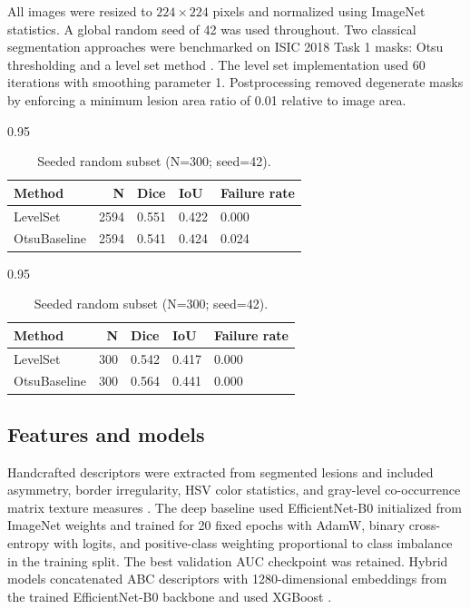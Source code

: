 \documentclass[preprint,12pt]{elsarticle}
\begin{document}
All images were resized to $224 \times 224$ pixels and normalized using ImageNet statistics. A global random seed of 42 was used throughout. Two classical segmentation approaches were benchmarked on ISIC 2018 Task 1 masks: Otsu thresholding \cite{otsu1979threshold} and a level set method \cite{osher1988fronts,li2010drlse}. The level set implementation used 60 iterations with smoothing parameter 1. Postprocessing removed degenerate masks by enforcing a minimum lesion area ratio of 0.01 relative to image area.

\begin{table}[htbp]
\centering
\caption{Segmentation benchmarking on ISIC 2018 Task 1.}
\label{tab:segmentation_benchmark}
\begin{subtable}[t]{0.95\textwidth}
\centering
\caption{Full set (N=2594).}
\begin{tabular}{lrlll}
\toprule
Method & N & Dice & IoU & Failure rate \\
\midrule
LevelSet & 2594 & 0.551 & 0.422 & 0.000 \\
OtsuBaseline & 2594 & 0.541 & 0.424 & 0.024 \\
\bottomrule
\end{tabular}
\end{subtable}

\vspace{0.6em}

\begin{subtable}[t]{0.95\textwidth}
\centering
\caption{Seeded random subset (N=300; seed=42).}
\begin{tabular}{lrlll}
\toprule
Method & N & Dice & IoU & Failure rate \\
\midrule
LevelSet & 300 & 0.542 & 0.417 & 0.000 \\
OtsuBaseline & 300 & 0.564 & 0.441 & 0.000 \\
\bottomrule
\end{tabular}
\end{subtable}
\end{table}

\subsection{Features and models}

Handcrafted descriptors were extracted from segmented lesions and included asymmetry, border irregularity, HSV color statistics, and gray-level co-occurrence matrix texture measures \cite{haralick1973textural,nachbar1994abcd}. The deep baseline used EfficientNet-B0 \cite{tan2019efficientnet} initialized from ImageNet weights and trained for 20 fixed epochs with AdamW, binary cross-entropy with logits, and positive-class weighting proportional to class imbalance in the training split. The best validation AUC checkpoint was retained. Hybrid models concatenated ABC descriptors with 1280-dimensional embeddings from the trained EfficientNet-B0 backbone and used XGBoost \cite{chen2016xgboost}.
\end{document}
